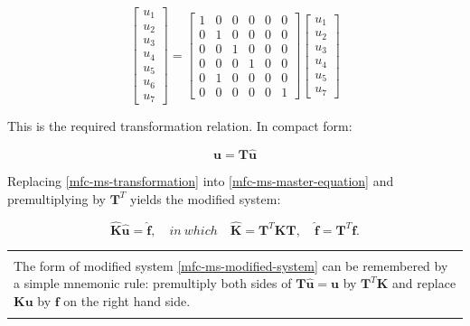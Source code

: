 \documentclass[10pt,b5paper,titlepage]{book}
\newcommand{\m}{\mathbf}
\newenvironment{bbox}[1][0.96]
{
    \begin{center}
        \begin{tabular}{|p{#1\textwidth}|}
            \hline\\
}
{
            \\\\\hline
        \end{tabular}
    \end{center}
}
\begin{document}
\begin{equation}\label{mfc-ms-transformation}
    \begin{bmatrix}
        u_1 \\
        u_2 \\
        u_3 \\
        u_4 \\
        u_5 \\
        u_6 \\
        u_7
    \end{bmatrix}
    = \begin{bmatrix}
        1 & 0 & 0 & 0 & 0 & 0 \\
        0 & 1 & 0 & 0 & 0 & 0 \\
        0 & 0 & 1 & 0 & 0 & 0 \\
        0 & 0 & 0 & 1 & 0 & 0 \\
        0 & 1 & 0 & 0 & 0 & 0 \\
        0 & 0 & 0 & 0 & 0 & 1
    \end{bmatrix}
    \begin{bmatrix}
        u_1 \\
        u_2 \\
        u_3 \\
        u_4 \\
        u_5 \\
        u_7
    \end{bmatrix}
\end{equation}

This is the required transformation relation. In compact form:

\begin{equation}
    \m{u} = \m{T} \m{\hat{u}}
\end{equation}


Replacing \eqref{mfc-ms-transformation} into \eqref{mfc-ms-master-equation} and
premultiplying by $ \m{T}^T $ yields the modified system:

\begin{equation}\label{mfc-ms-modified-system}
    \m{\hat{K}} \m{\hat{u}} = \m{\hat{f}}, \quad
    in\ which \quad \m{\hat{K}} = \m{T}^T \m{K} \m{T}, \quad
    \m{\hat{f}} = \m{T}^T \m{f}.
\end{equation}

\begin{bbox}
    The form of modified system \eqref{mfc-ms-modified-system} can be remembered
    by a simple mnemonic rule: premultiply both sides of $
    \m{T} \m{\hat{u}} = \m{u} $
    by $ \m{T}^T \m{K} $ and replace $ \m{K} \m{u} $ by
    $ \m{f} $ on the right hand side.
\end{bbox}
\end{document}
